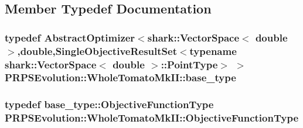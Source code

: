\subsection{\-Member \-Typedef \-Documentation}
\hypertarget{struct_p_r_p_s_evolution_1_1_whole_tomato_mk_i_i_aa73bd76425f7fd7bf645f824163eaa88}{
\subsubsection[{base\-\_\-type}]{\setlength{\rightskip}{0pt plus 5cm}typedef \-Abstract\-Optimizer$<$shark\-::\-Vector\-Space$<$ double $>$,double,\-Single\-Objective\-Result\-Set$<$typename shark\-::\-Vector\-Space$<$ double $>$\-::\-Point\-Type$>$ $>$ {\bf \-P\-R\-P\-S\-Evolution\-::\-Whole\-Tomato\-Mk\-I\-I\-::base\-\_\-type}}}\label{struct_p_r_p_s_evolution_1_1_whole_tomato_mk_i_i_aa73bd76425f7fd7bf645f824163eaa88}
\hypertarget{struct_p_r_p_s_evolution_1_1_whole_tomato_mk_i_i_a55a538be606675a78b62960448ef4aef}{
\subsubsection[{\-Objective\-Function\-Type}]{\setlength{\rightskip}{0pt plus 5cm}typedef base\-\_\-type\-::\-Objective\-Function\-Type {\bf \-P\-R\-P\-S\-Evolution\-::\-Whole\-Tomato\-Mk\-I\-I\-::\-Objective\-Function\-Type}}}\label{struct_p_r_p_s_evolution_1_1_whole_tomato_mk_i_i_a55a538be606675a78b62960448ef4aef}


